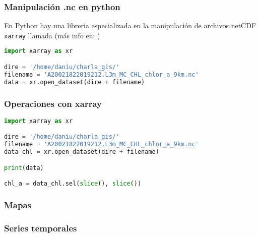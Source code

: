 \documentclass{beamer}
\begin{document}
\begin{frame}[fragile]
\frametitle{Manipulación .nc en python}

En Python hay una libreria especializada en la manipulación de archivos netCDF \texttt{xarray} llamada (más info en: \href{http://xarray.pydata.org/en/stable/}{})

\begin{lstlisting}[language=python, basicstyle=\scriptsize]
import xarray as xr

dire = '/home/daniu/charla_gis/'
filename = 'A20021822019212.L3m_MC_CHL_chlor_a_9km.nc'
data = xr.open_dataset(dire + filename)
\end{lstlisting}

\begin{figure}
	
	
\end{figure}
\end{frame}


\begin{frame}[fragile]
\frametitle{Operaciones con xarray}

\begin{lstlisting}[language=python, basicstyle=\scriptsize]
import xarray as xr

dire = '/home/daniu/charla_gis/'
filename = 'A20021822019212.L3m_MC_CHL_chlor_a_9km.nc'
data_chl = xr.open_dataset(dire + filename)

print(data)

chl_a = data_chl.sel(slice(), slice())

\end{lstlisting}

\end{frame}


\begin{frame}[fragile]
\frametitle{Mapas}

\end{frame}

\begin{frame}[fragile]
\frametitle{Series temporales}

\end{frame}
\end{document}
